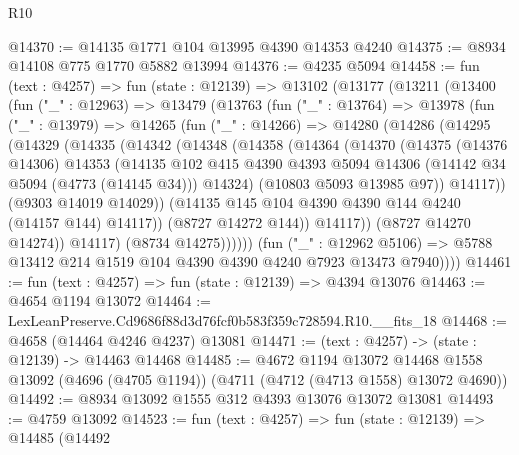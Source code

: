 \begin{lexlean}{R10}
\begin{coremodule}
@14370 := @14135 @1771 @104 @13995 @4390 @14353 @4240
@14375 := @8934 @14108 @775 @1770 @5882 @13994
@14376 := @4235 @5094
@14458 := fun (text : @4257) =>
  fun (state : @12139) =>
  @13102
    (@13177
      (@13211
        (@13400
          (fun ("_" : @12963) =>
          @13479
            (@13763
              (fun ("_" : @13764) =>
              @13978
                (fun ("_" : @13979) =>
                @14265
                  (fun ("_" : @14266) =>
                  @14280
                    (@14286
                      (@14295
                        (@14329
                          (@14335
                            (@14342
                              (@14348
                                (@14358
                                  (@14364
                                    (@14370
                                      (@14375
                                        (@14376 @14306)
                                        @14353
                                        (@14135
                                          @102
                                          @415
                                          @4390
                                          @4393
                                          @5094
                                          @14306
                                          (@14142 @34 @5094 (@4773 (@14145 @34)))
                                          @14324)
                                        (@10803 @5093 @13985 @97))
                                      @14117))
                                  (@9303 @14019 @14029))
                                (@14135 @145 @104 @4390 @4390 @144 @4240 (@14157 @144) @14117))
                              (@8727 @14272 @144))
                            @14117))
                        (@8727 @14270 @14274))
                      @14117)
                    (@8734 @14275))))))
          (fun ("_" : @12962 @5106) =>
          @5788 @13412 @214 @1519 @104 @4390 @4390 @4240 @7923 @13473 @7940))))
@14461 := fun (text : @4257) => fun (state : @12139) => @4394 @13076
@14463 := @4654 @1194 @13072
@14464 := LexLeanPreserve.Cd9686f88d3d76fcf0b583f359c728594.R10.__fits_18
@14468 := @4658 (@14464 @4246 @4237) @13081
@14471 := (text : @4257) -> (state : @12139) -> @14463 @14468
@14485 := @4672
    @1194
    @13072
    @14468
    @1558
    @13092
    (@4696 (@4705 @1194))
    (@4711 (@4712 (@4713 @1558) @13072 @4690))
@14492 := @8934 @13092 @1555 @312 @4393 @13076 @13072 @13081
@14493 := @4759 @13092
@14523 := fun (text : @4257) =>
  fun (state : @12139) =>
  @14485
    (@14492

\end{coremodule}
\end{lexlean}
